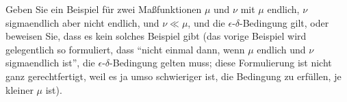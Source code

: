 
\begin{exercise}

Geben Sie ein Beispiel für zwei Maßfunktionen $\mu$ und $\nu$ mit $\mu$ endlich, $\nu$ sigmaendlich aber nicht endlich, und $\nu \ll \mu$, und die $\epsilon$-$\delta$-Bedingung gilt, oder beweisen Sie, dass es kein solches Beispiel gibt (das vorige Beispiel wird gelegentlich so formuliert, dass \enquote{nicht einmal dann, wenn $\mu$ endlich und $\nu$ sigmaendlich ist}, die $\epsilon$-$\delta$-Bedingung gelten muss; diese Formulierung ist nicht ganz gerechtfertigt, weil es ja umso schwieriger ist, die Bedingung zu erfüllen, je kleiner $\mu$ ist).

\end{exercise}


